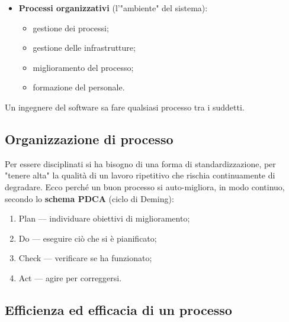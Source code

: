 \documentclass[a4paper]{article}
\begin{document}
\begin{itemize}
\begin{itemize}
	\end{itemize}

			
			
	\item \textbf{Processi organizzativi} (l'"ambiente" del sistema):
				
	\begin{itemize}
		
					
	\item gestione dei processi;
					
	\item gestione delle infrastrutture;
					
	\item miglioramento del processo;
					
	\item formazione del personale.
				
	\end{itemize}

			
		
	\end{itemize}

		
Un ingegnere del software sa fare qualsiasi processo tra i suddetti.

		
	\subsection{Organizzazione di processo}

		
Per essere disciplinati si ha bisogno di una forma di standardizzazione, per "tenere alta" la qualità di un lavoro ripetitivo che rischia continuamente di degradare. Ecco perché un buon processo si auto-migliora, in modo continuo, secondo lo \textbf{schema PDCA} (ciclo di Deming):
		
	\begin{enumerate}
		
			
	\item Plan --- individuare obiettivi di miglioramento;
			
	\item Do --- eseguire ciò che si è pianificato;
			
	\item Check --- verificare se ha funzionato;
			
	\item Act --- agire per correggersi.
		
	\end{enumerate}


		
	\subsection{Efficienza ed efficacia di un processo}
\end{document}
